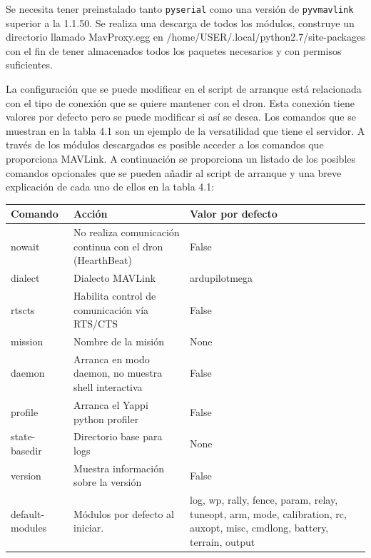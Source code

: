 Se necesita tener preinstalado tanto \texttt{pyserial} como una versión de \texttt{pyvmavlink} superior a la 1.1.50. Se realiza una descarga de todos los módulos, construye un directorio llamado MavProxy.egg en /home/USER/.local/python2.7/site-packages con el fin de tener almacenados todos los paquetes necesarios y con permisos suficientes. 

La configuración que se puede modificar en el script de arranque está relacionada con el tipo de conexión que se quiere mantener con el dron. Esta conexión tiene valores por defecto pero se puede modificar si así se desea. Los comandos que se muestran en la tabla 4.1 son un ejemplo de la versatilidad que tiene el servidor. A través de los módulos descargados es posible acceder a los comandos que proporciona MAVLink. A continuación se proporciona un listado de los posibles comandos opcionales que se pueden añadir al script de arranque y una breve explicación de cada uno de ellos en la tabla 4.1:
\begin{center}
  \label{tab:scriptArranqueComandos2}
  \begin{tabular}{ | l | p{7cm} | p{3.5cm} |}
  \hline
    \textbf{Comando} & \textbf{Acción} & \textbf{Valor por defecto} \\ \hline
    nowait&No realiza comunicación continua con el dron (HearthBeat) &  False\\ \hline
    dialect & Dialecto MAVLink& ardupilotmega \\ \hline
    rtscts& Habilita control de comunicación vía RTS/CTS&  False\\ \hline
    mission& Nombre de la misión& None \\ \hline
    daemon & Arranca en modo daemon, no muestra shell interactiva & False \\ \hline
    profile& Arranca el Yappi python profiler& False \\ \hline
    state-basedir& Directorio base para logs& None \\ \hline
    version& Muestra información sobre la versión& False \\ \hline
    default-modules& Módulos por defecto al iniciar.& log, wp, rally, fence, param, relay, tuneopt, arm, mode, calibration, rc, auxopt, misc, cmdlong, battery, terrain, output \\ \hline
  \end{tabular}
\end{center}

